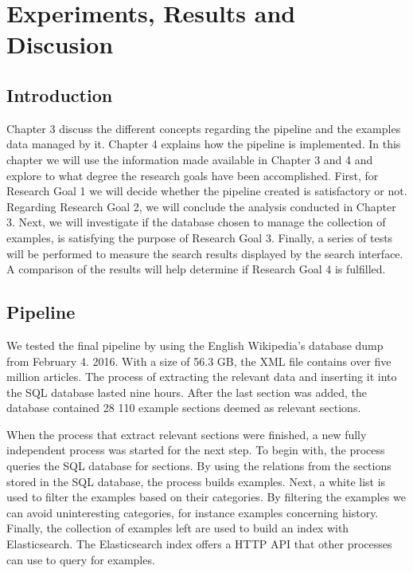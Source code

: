 
\chapter{Experiments, Results and Discusion} \label{cap_5}

\section{Introduction}

Chapter 3 discuss the different concepts regarding the pipeline and the examples data managed by it. Chapter 4 explains how the pipeline is implemented. In this chapter we will use the information made available in Chapter 3 and 4 and explore to what degree the research goals have been accomplished. First, for Research Goal 1 we will decide whether the pipeline created is satisfactory or not. Regarding Research Goal 2, we will conclude the analysis conducted in Chapter 3. Next, we will investigate if the database chosen to manage the collection of examples, is satisfying the purpose of Research Goal 3. Finally, a series of tests will be performed to measure the search results displayed by the search interface. A comparison of the results will help determine if Research Goal 4 is fulfilled.

\section{Pipeline}

We tested the final pipeline by using the English Wikipedia's database dump from February 4. 2016. With a size of 56.3 GB, the XML file contains over five million articles. The process of extracting the relevant data and inserting it into the SQL database lasted nine hours. After the last section was added, the database contained 28 110 example sections deemed as relevant sections.

When the process that extract relevant sections were finished, a new fully independent process was started for the next step. To begin with, the process queries the SQL database for sections. By using the relations from the sections stored in the SQL database, the process builds examples. Next, a white list is used to filter the examples based on their categories. By filtering the examples we can avoid uninteresting categories, for instance examples concerning history. Finally, the collection of examples left are used to build an index with Elasticsearch. The Elasticsearch index offers a HTTP API that other processes can use to query for examples.

